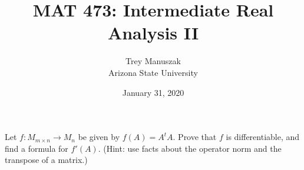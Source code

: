 \documentclass[12pt]{article}
\title{MAT 473: Intermediate Real Analysis II}
\date{January 31, 2020}
\author{Trey Manuszak\\ Arizona State University}
\newenvironment{problem}[2][Problem]{\begin{trivlist}
\item[\hskip \labelsep {\bfseries #1}\hskip \labelsep {\bfseries #2.}]}{\end{trivlist}}
\begin{document}




\maketitle
\newpage





\begin{problem}{5} 
Let $f : M_{m \times n} \to M_n$ be given by $f(A) = A^tA$. Prove that $f$ is differentiable, and find a formula for $f'(A)$. (Hint: use facts about the operator norm and the transpose of a matrix.)
\end{problem}
\end{document}
